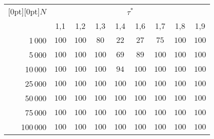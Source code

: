 \begin{multicols}{2}
\begin{center}
{\small
\tabcolsep=4.8pt
\begin{tabular}{|r|c|c|c|c|c|c|c|c|}
\hline
\multicolumn{1}{|c|}{\raisebox{-6pt}[0pt][0pt]{$N$}} &\multicolumn{8}{c|}{$\tau^*$}\\
\cline{2-9}
& 1,1 & 1,2 & 1,3 & 1,4 & 1,6 & 1,7 & 1,8 & 1,9 \\ 
\hline
1\,000 & $100$ & $100$ & \hphantom{9}$80$ & \hphantom{9}$22$ & \hphantom{9}$27$ & \hphantom{9}$75$ & $100$ & $100$ \\
5\,000 & $100$ & $100$ & $100$ & \hphantom{9}$69$ & \hphantom{9}$89$ & $100$ & $100$ & $100$ \\
10\,000 & $100$ & $100$ & $100$ & \hphantom{9}$94$ & $100$ & $100$ & $100$ & $100$ \\
25\,000 & $100$ & $100$ & $100$ & $100$ & $100$ & $100$ & $100$ & $100$ \\
50\,000 & $100$ & $100$ & $100$ & $100$ & $100$ & $100$ & $100$ & $100$ \\
75\,000 & $100$ & $100$ & $100$ & $100$ & $100$ & $100$ & $100$ & $100$ \\
100\,000 & $100$ & $100$ & $100$ & $100$ & $100$ & $100$ & $100$ & $100$ \\ \hline
\end{tabular}
}
\end{center}



\addtocounter{table}{3}



\end{multicols}

\vspace*{1pt}



